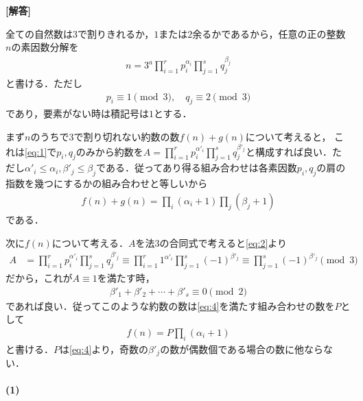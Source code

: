 \documentclass[../../main.tex]{subfiles}
\begin{document}
\begin{oframed}
  
\end{oframed}

{\bf [解答]}

全ての自然数は$3$で割りきれるか，$1$または$2$余るかであるから，任意の正の整数$n$の素因数分解を
\begin{align}
  n=3^a\prod_{i=1}^r p_i^{\alpha_i}\prod_{j=1}^s q_j^{\beta_j} \label{eq:1}
\end{align}
と書ける．ただし
\begin{align}
  p_i\equiv1\pmod{3},
  \quad
  q_j\equiv2\pmod{3} \label{eq:2}
\end{align}
であり，要素がない時は積記号は$1$とする．

まず$n$のうちで$3$で割り切れない約数の数$f(n)+g(n)$について考えると，
これは\cref{eq:1}で$p_i,q_j$のみから約数を$A=\prod_{i=1}^r p_i^{\alpha'_i}\prod_{j=1}^s q_j^{\beta'_j}$と構成すれば良い．ただし$\alpha'_i \le \alpha_i, \beta'_j \le \beta_j$である．従ってあり得る組み合わせは各素因数$p_i,q_j$の肩の指数を幾つにするかの組み合わせと等しいから
\begin{align}
  f(n) + g(n) = \prod_i(\alpha_i+1)\prod_j(\beta_j+1) \label{eq:3}
\end{align}
である．

次に$f(n)$について考える．$A$を法$3$の合同式で考えると\cref{eq:2}より
\begin{align}
  A & = \prod_{i=1}^r p_i^{\alpha'_i}\prod_{j=1}^s q_j^{\beta'_j}
  \equiv \prod_{i=1}^r 1^{\alpha'_i} \prod_{j=1}^s (-1)^{\beta'_j}
  \equiv \prod_{j=1}^s (-1)^{\beta'_j} \pmod{3}
\end{align}
だから，これが$A\equiv 1$を満たす時，
\begin{align}
  \beta'_1 + \beta'_2 + \cdots + \beta'_s \equiv 0 \pmod{2}  \label{eq:4}
\end{align}
であれば良い．従ってこのような約数の数は\cref{eq:4}を満たす組み合わせの数を$P$として
\begin{align}
  f(n) = P\prod_i(\alpha_i+1) \label{eq:5}
\end{align}
と書ける．$P$は\cref{eq:4}より，奇数の$\beta'_j$の数が偶数個である場合の数に他ならない．

\paragraph{(1)}
\end{document}

